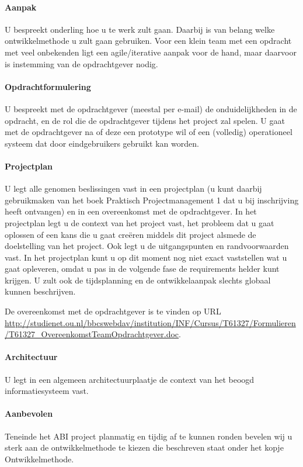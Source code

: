 \paragraph{Aanpak}
U bespreekt onderling hoe u te werk zult gaan. Daarbij is van belang
welke ontwikkelmethode u zult gaan gebruiken. Voor een klein team
met een opdracht met veel onbekenden ligt een agile/iterative aanpak
voor de hand, maar daarvoor is instemming van de opdrachtgever nodig.

\paragraph{Opdrachtformulering}
U bespreekt met de opdrachtgever (meestal per e-mail) de
onduidelijkheden in de opdracht, en de rol die de opdrachtgever
tijdens het project zal spelen.
U gaat met de opdrachtgever na of deze een prototype wil of een
(volledig) operationeel systeem dat door eindgebruikers gebruikt kan
worden.

\paragraph{Projectplan}
U legt alle genomen beslissingen vast in een projectplan (u kunt daarbij
gebruikmaken van het boek Praktisch Projectmanagement 1 dat u bij
inschrijving heeft ontvangen) en in een overeenkomst met de opdrachtgever. In het
projectplan legt u de context van het project vast, het probleem dat u gaat
oplossen of een kans die u gaat creëren middels dit project alsmede de doelstelling
van het project. Ook legt u de uitgangspunten en randvoorwaarden vast.
In het projectplan kunt u op dit moment nog niet exact vaststellen wat u
gaat opleveren, omdat u pas in de volgende fase de requirements
helder kunt krijgen. U zult ook de tijdsplanning en de ontwikkelaanpak
slechts globaal kunnen beschrijven.

De overeenkomst met de opdrachtgever is te vinden op
URL \url{http://studienet.ou.nl/bbcswebdav/institution/INF/Cursus/T61327/Formulieren/T61327_OvereenkomstTeamOpdrachtgever.doc}.

\paragraph{Architectuur}
U legt in een algemeen architectuurplaatje de context van het beoogd
informatiesysteem vast.
\paragraph{Aanbevolen}
Teneinde het ABI project planmatig en tijdig af te kunnen ronden bevelen wij
u sterk aan de ontwikkelmethode te kiezen die beschreven staat onder het kopje
Ontwikkelmethode.

